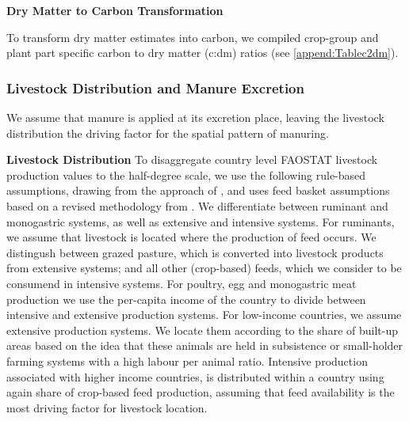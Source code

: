 \documentclass[gc, manuscript]{copernicus}
\begin{document}
\textbf{Dry Matter to Carbon Transformation}

To transform dry matter estimates into carbon, we compiled crop-group and plant part specific carbon to dry matter (c:dm) ratios (see \ref{append:Tablec2dm}).

\hypertarget{sec:livstmanure}{%
\subsubsection{Livestock Distribution and Manure Excretion}\label{sec:livstmanure}}

We assume that manure is applied at its excretion place, leaving the livestock distribution the driving factor for the spatial pattern of manuring.

\textbf{Livestock Distribution}
To disaggregate country level FAOSTAT livestock production values to the half-degree scale, we use the following rule-based assumptions, drawing from the approach of \citep{robinson_mapping_2014}, and uses feed basket assumptions based on a revised methodology from \citep{weindl}. We differentiate between ruminant and monogastric systems, as well as extensive and intensive systems.
For ruminants, we assume that livestock is located where the production of feed occurs. We distingush between grazed pasture, which is converted into livestock products from extensive systems; and all other (crop-based) feeds, which we consider to be consumend in intensive systems.
For poultry, egg and monogastric meat production we use the per-capita income of the country to divide between intensive and extensive production systems. For low-income countries, we assume extensive production systems. We locate them according to the share of built-up areas based on the idea that these animals are held in subsistence or small-holder farming systems with a high labour per animal ratio. Intensive production associated with higher income countries, is distributed within a country using again share of crop-based feed production, assuming that feed availability is the most driving factor for livestock location.
\end{document}
